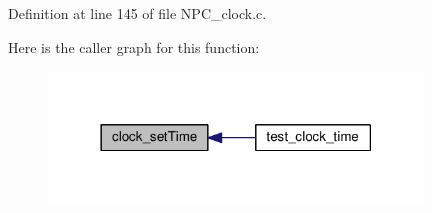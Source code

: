 Definition at line 145 of file N\+P\+C\+\_\+clock.\+c.



Here is the caller graph for this function\+:\nopagebreak
\begin{figure}[H]
\begin{center}
\leavevmode
\includegraphics[width=282pt]{de/dbe/group___clock___time___date_ga11404197d58ddf6b46230bcde4282ef2_icgraph}
\end{center}
\end{figure}


